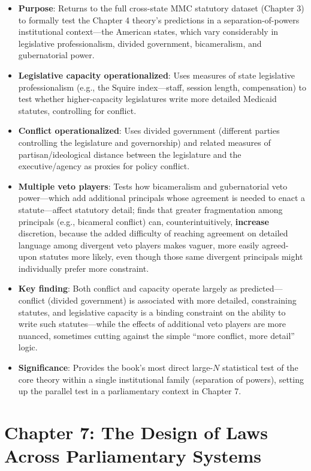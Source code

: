 \documentclass[12pt]{article}
\begin{document}
\begin{itemize}[leftmargin=*, itemsep=4pt]
    \item \textbf{Purpose}: Returns to the full cross-state MMC statutory dataset (Chapter 3) to formally test the Chapter 4 theory's predictions in a separation-of-powers institutional context---the American states, which vary considerably in legislative professionalism, divided government, bicameralism, and gubernatorial power.
    \item \textbf{Legislative capacity operationalized}: Uses measures of state legislative professionalism (e.g., the Squire index---staff, session length, compensation) to test whether higher-capacity legislatures write more detailed Medicaid statutes, controlling for conflict.
    \item \textbf{Conflict operationalized}: Uses divided government (different parties controlling the legislature and governorship) and related measures of partisan/ideological distance between the legislature and the executive/agency as proxies for policy conflict.
    \item \textbf{Multiple veto players}: Tests how bicameralism and gubernatorial veto power---which add additional principals whose agreement is needed to enact a statute---affect statutory detail; finds that greater fragmentation among principals (e.g., bicameral conflict) can, counterintuitively, \textbf{increase} discretion, because the added difficulty of reaching agreement on detailed language among divergent veto players makes vaguer, more easily agreed-upon statutes more likely, even though those same divergent principals might individually prefer more constraint.
    \item \textbf{Key finding}: Both conflict and capacity operate largely as predicted---conflict (divided government) is associated with more detailed, constraining statutes, and legislative capacity is a binding constraint on the ability to write such statutes---while the effects of additional veto players are more nuanced, sometimes cutting against the simple ``more conflict, more detail'' logic.
    \item \textbf{Significance}: Provides the book's most direct large-$N$ statistical test of the core theory within a single institutional family (separation of powers), setting up the parallel test in a parliamentary context in Chapter 7.
\end{itemize}

\section{Chapter 7: The Design of Laws Across Parliamentary Systems}
\end{document}

